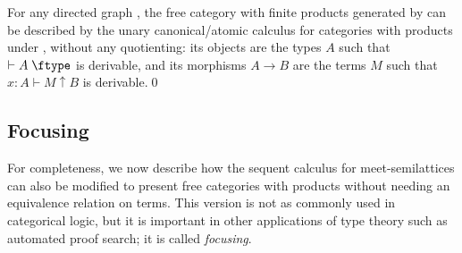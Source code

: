 \documentclass{book}
\let\types\vdash
\def\type{\;\ftype}
\newcommand{\can}{\mathrel{\uparrow}}
\begin{document}
\begin{thm}\label{thm:atomcan-catprod-initial}
  For any directed graph \cG, the free category with finite products generated by \cG can be described by the unary canonical/atomic calculus for categories with products under \cG, without any quotienting: its objects are the types $A$ such that $\types A\type$ is derivable, and its morphisms $A\to B$ are the terms $M$ such that $x:A \types M\can B$ is derivable.\qed
\end{thm}


\subsection{Focusing}
\label{sec:catprod-focusing}

For completeness, we now describe how the sequent calculus for meet-semilattices can also be modified to present free categories with products without needing an equivalence relation on terms.
This version is not as commonly used in categorical logic, but it is important in other applications of type theory such as automated proof search; it is called \emph{focusing}.
\end{document}
